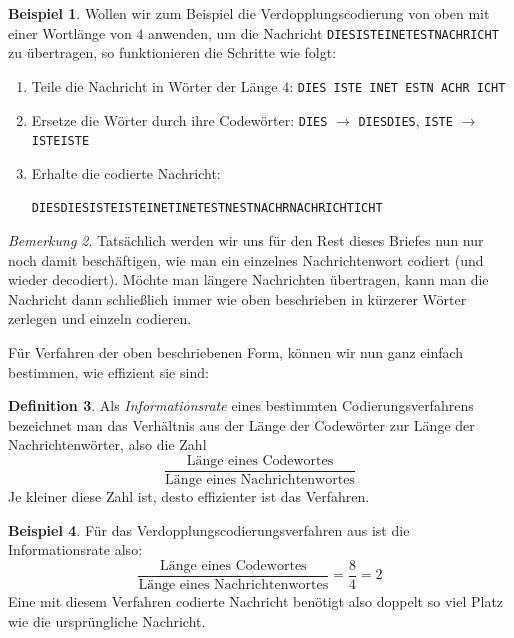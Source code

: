 \documentclass[a4paper,ngerman,12pt]{scrartcl}
\theoremstyle{definition}
\newtheorem{defn}{Definition}[]
\newtheorem{bsp}[defn]{Beispiel}
\theoremstyle{plain}
\theoremstyle{remark}
\newtheorem{bem}[defn]{Bemerkung}
\begin{document}
\begin{bsp}\label{bsp:Verdopplungscodierung}
	Wollen wir zum Beispiel die Verdopplungscodierung von oben mit einer Wortlänge von $4$ anwenden, um die Nachricht \texttt{DIESISTEINETESTNACHRICHT} zu übertragen, so funktionieren die Schritte wie folgt:
	\begin{enumerate}
		\item Teile die Nachricht in Wörter der Länge $4$: \texttt{DIES ISTE INET ESTN ACHR ICHT}
		\item Ersetze die Wörter durch ihre Codewörter: \texttt{DIES} $\rightarrow$ \texttt{DIESDIES}, \texttt{ISTE} $\rightarrow$ \texttt{ISTEISTE}
		\item Erhalte die codierte Nachricht:	
		 \begin{center}
		 	\texttt{DIESDIESISTEISTEINETINETESTNESTNACHRNACHRICHTICHT}
		 \end{center}
	\end{enumerate}
\end{bsp}

\begin{bem}
	Tatsächlich werden wir uns für den Rest dieses Briefes nun nur noch damit beschäftigen, wie man ein einzelnes Nachrichtenwort codiert (und wieder decodiert). Möchte man längere Nachrichten übertragen, kann man die Nachricht dann schließlich immer wie oben beschrieben in kürzerer Wörter zerlegen und einzeln codieren.
\end{bem}

Für Verfahren der oben beschriebenen Form, können wir nun ganz einfach bestimmen, wie effizient sie sind:

\begin{defn}
	Als \emph{Informationsrate} eines bestimmten Codierungsverfahrens bezeichnet man das Verhältnis aus der Länge der Codewörter zur Länge der Nachrichtenwörter, also die Zahl
		\[\frac{\text{Länge eines Codewortes}}{\text{Länge eines Nachrichtenwortes}}\]
	Je kleiner diese Zahl ist, desto effizienter ist das Verfahren.
\end{defn}

\begin{bsp}
	Für das Verdopplungscodierungsverfahren aus  ist die Informationsrate also:
		\[\frac{\text{Länge eines Codewortes}}{\text{Länge eines Nachrichtenwortes}} = \frac{8}{4} = 2\]
	Eine mit diesem Verfahren codierte Nachricht benötigt also doppelt so viel Platz wie die ursprüngliche Nachricht.
\end{bsp}
\end{document}
